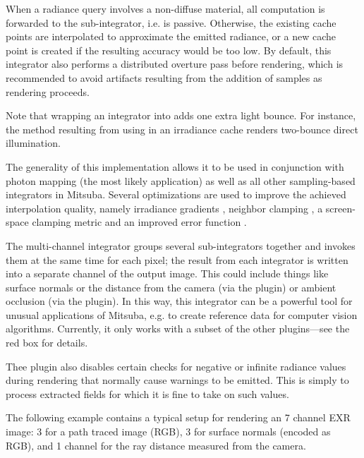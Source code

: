 When a radiance query involves a non-diffuse material, all computation
is forwarded to the sub-integrator, i.e.  is passive.
Otherwise, the existing cache points are interpolated to approximate the
emitted radiance, or a new cache point is created if the resulting accuracy
would be too low.
By default, this integrator also performs a distributed overture pass before
rendering, which is recommended to avoid artifacts resulting from the
addition of samples as rendering proceeds.

Note that wrapping an integrator into  adds one extra
light bounce. For instance, the method resulting from using 
in an irradiance cache renders two-bounce direct illumination.

The generality of this implementation allows it to be used in conjunction
with photon mapping (the most likely application) as well as all other
sampling-based integrators in Mitsuba. Several optimizations are used to
improve the achieved interpolation quality, namely irradiance gradients
\cite{Ward1992Irradiance}, neighbor clamping \cite{Krivanek2006Making}, a screen-space
clamping metric and an improved error function \cite{Tabellion2004Approximate}.

The multi-channel integrator groups several sub-integrators together
and invokes them at the same time for each pixel; the result from each
integrator is written into a separate channel of the output image.
This could include things like surface normals or the distance
from the camera (via the  plugin) or ambient occlusion
(via the  plugin).
In this way, this integrator can be a powerful tool for unusual applications
of Mitsuba, e.g. to create reference data for computer vision algorithms. Currently, it only
works with a subset of the other plugins---see the red box for details.

Thee  plugin also disables certain checks for negative or infinite
radiance values during rendering that normally cause warnings to be emitted.
This is simply to process extracted fields for which it is fine
to take on such values.

The following example contains a typical setup for rendering an 7 channel EXR image:
3 for a path traced image (RGB), 3 for surface normals
(encoded as RGB), and 1 channel for the ray distance measured from the camera.


